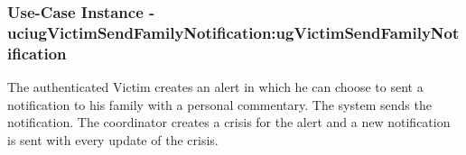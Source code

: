
	\subsubsection{Use-Case Instance - uciugVictimSendFamilyNotification:ugVictimSendFamilyNotification}
	
	The authenticated Victim creates an alert in which he can choose to sent a notification to his family with a personal commentary. 
	The system sends the notification. The coordinator creates a crisis for the alert and a new notification is sent
	with every update of the crisis.		  
	\begin{operationmodel}
	
	\end{operationmodel} 

	
